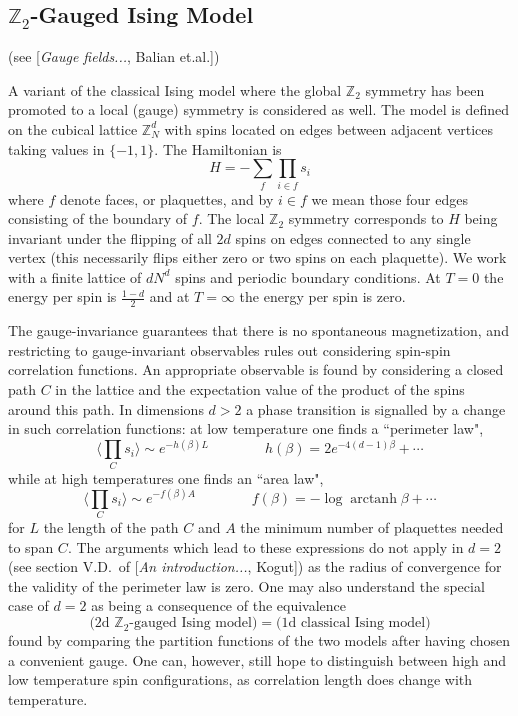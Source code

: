\documentclass[11pt]{article}
\begin{document}
\newpage
\subsection{$\mathbb{Z}_2$-Gauged Ising Model}
(see [\textit{Gauge fields...}, Balian et.al.])

A variant of the classical Ising model where the global $\mathbb{Z}_2$ symmetry has been promoted to a local (gauge) symmetry is considered as well. The model is defined on the cubical lattice $\mathbb{Z}_N^d$ with spins located on edges between adjacent vertices taking values in $\{{-1},1\}$. The Hamiltonian is
\begin{equation}
    H = - \sum_f\prod_{i\in f}s_i
\end{equation}
where $f$ denote faces, or plaquettes, and by $i\in f$ we mean those four edges consisting of the boundary of $f$. The local $\mathbb{Z}_2$ symmetry corresponds to $H$ being invariant under the flipping of all $2d$ spins on edges connected to any single vertex (this necessarily flips either zero or two spins on each plaquette). We work with a finite lattice of $dN^d$ spins and periodic boundary conditions. At $T=0$ the energy per spin is $\frac{1-d}{2}$ and at $T=\infty$ the energy per spin is zero.

The gauge-invariance guarantees that there is no spontaneous magnetization, and restricting to gauge-invariant observables rules out considering spin-spin correlation functions. An appropriate observable is found by considering a closed path $C$ in the lattice and the expectation value of the product of the spins around this path. In dimensions $d>2$ a phase transition is signalled by a change in such correlation functions: at low temperature one finds a ``perimeter law",
\begin{equation}
    \Big\langle\prod_C s_i\Big\rangle \sim e^{-h(\beta)L} \qquad\qquad h(\beta) = 2e^{-4(d-1)\beta} + \cdots
\end{equation}
while at high temperatures one finds an ``area law",
\begin{equation}
    \Big\langle\prod_C s_i\Big\rangle \sim e^{-f(\beta)A} \qquad\qquad f(\beta) = -\log\operatorname{arctanh}{\beta} + \cdots
\end{equation}
for $L$ the length of the path $C$ and $A$ the minimum number of plaquettes needed to span $C$. The arguments which lead to these expressions do not apply in $d=2$ (see section V.D.~of [\textit{An introduction...}, Kogut]) as the radius of convergence for the validity of the perimeter law is zero. One may also understand the special case of $d=2$ as being a consequence of the equivalence
\begin{equation}
    \big(\text{2d }\mathbb{Z}_2\text{-gauged Ising model}\big) = \big( \text{1d classical Ising model} \big)
\end{equation}
found by comparing the partition functions of the two models after having chosen a convenient gauge. One can, however, still hope to distinguish between high and low temperature spin configurations, as correlation length does change with temperature.
\end{document}
